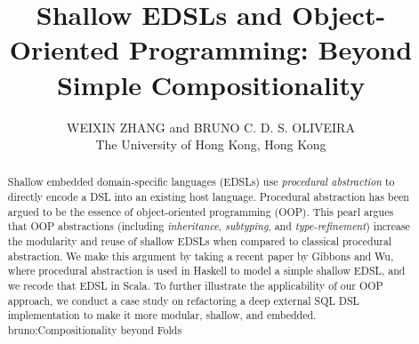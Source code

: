 \documentclass{jfp1}
\newcommand{\an}[3]{{\color{#2} {\sc #1}:#3}}
\newcommand{\bruno}[1]{\an{bruno}{blue}{#1}}
\begin{document}
\title{Shallow EDSLs and Object-Oriented Programming: Beyond Simple Compositionality}

\author[W. Zhang and B. Oliveira]
        {WEIXIN ZHANG and BRUNO C. D. S. OLIVEIRA\\
         The University of Hong Kong, Hong Kong}

\maketitle[f]

\begin{abstract}
Shallow embedded domain-specific languages (EDSLs) use
\emph{procedural abstraction} to directly encode a DSL into an existing host language. Procedural abstraction has
been argued to be the essence of object-oriented programming (OOP).
This pearl argues that OOP abstractions
(including \emph{inheritance}, \emph{subtyping}, and
\emph{type-refinement})
increase the modularity and reuse of shallow
EDSLs when compared to classical procedural abstraction. We make this
argument by taking a recent paper by Gibbons and Wu, where procedural
abstraction is used in Haskell to model a simple shallow EDSL, and we recode
that EDSL in Scala. 
To further illustrate the applicability of our OOP approach, we conduct
a case study on refactoring a deep external SQL DSL implementation to make it
more modular, shallow, and embedded.
\bruno{Compositionality beyond Folds}
\end{abstract}















\end{document}
